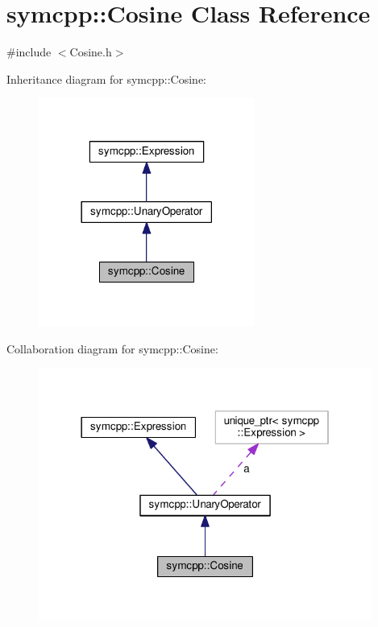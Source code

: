 \hypertarget{classsymcpp_1_1Cosine}{}\section{symcpp\+:\+:Cosine Class Reference}
\label{classsymcpp_1_1Cosine}


{\ttfamily \#include $<$Cosine.\+h$>$}



Inheritance diagram for symcpp\+:\+:Cosine\+:\nopagebreak
\begin{figure}[H]
\begin{center}
\leavevmode
\includegraphics[width=201pt]{classsymcpp_1_1Cosine__inherit__graph}
\end{center}
\end{figure}


Collaboration diagram for symcpp\+:\+:Cosine\+:\nopagebreak
\begin{figure}[H]
\begin{center}
\leavevmode
\includegraphics[width=310pt]{classsymcpp_1_1Cosine__coll__graph}
\end{center}
\end{figure}
